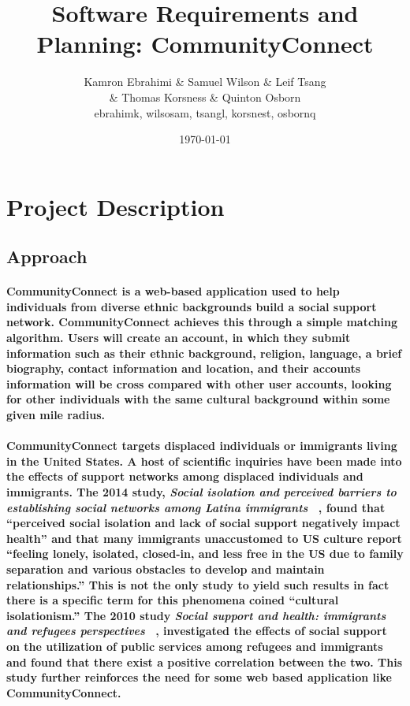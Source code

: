 \documentclass[12pt]{article}
\title{Software Requirements and Planning: CommunityConnect}
\author{Kamron Ebrahimi \& Samuel Wilson \& Leif Tsang \\ \& Thomas Korsness  \& Quinton Osborn \\ ebrahimk, wilsosam, tsangl, korsnest, osbornq}
\date{\today}
\begin{document}
\maketitle

\tableofcontents

\section{\bf Project Description}
	\subsection{\bf Approach}
                \paragraph{\normalfont \indent CommunityConnect is a web-based application used to help individuals from diverse ethnic backgrounds build a social support network. CommunityConnect achieves this through a simple matching algorithm. Users will create an account, in which they submit information such as their ethnic background, religion, language, a brief biography, contact information and location, and their accounts information will be cross compared with other user accounts, looking for other individuals with the same cultural background within some given mile radius.}
           \paragraph{\normalfont \indent CommunityConnect targets displaced individuals or immigrants living in the United States. A host of scientific inquiries have been made into the effects of support networks among displaced individuals and immigrants. The 2014 study, \textit{Social isolation and perceived barriers to establishing social networks among Latina immigrants} ~\cite{Cite1}, found that “perceived social isolation and lack of social support negatively impact health” and  that many immigrants unaccustomed to US culture report “feeling lonely, isolated, closed-in, and less free in the US due to family separation and various obstacles to develop and maintain relationships.” This is not the only study to yield such results in fact there is a specific term for this phenomena coined “cultural isolationism.” The 2010 study \textit{Social support and health: immigrants and refugees perspectives} ~\cite{Cite2}, investigated the effects of social support on the utilization of public services among refugees and immigrants and found that there exist a positive correlation between the two. This study further reinforces the need for some web based application like CommunityConnect.} 
\end{document}
